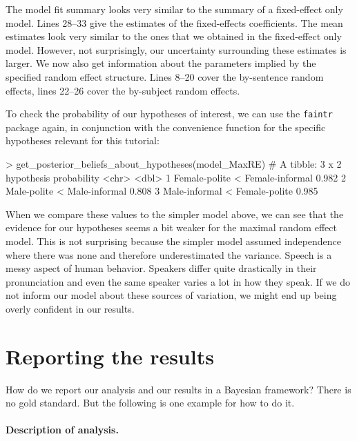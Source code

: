\documentclass[nobib]{tufte-handout}
\begin{document}
The model fit summary looks very similar to the summary of a fixed-effect only model. Lines 28--33 give the estimates of the fixed-effects coefficients. The mean estimates look very similar to the ones that we obtained in the fixed-effect only model. However, not surprisingly, our uncertainty surrounding these estimates is larger.  
We now also get information about the parameters implied by the specified random effect
structure. Lines 8--20 cover the by-sentence random effects, lines 22--26 cover the by-subject
random effects.

To check the probability of our hypotheses of interest, we can use the \texttt{faintr} package again, in conjunction with the convenience function for the specific hypotheses relevant for this tutorial:

\medskip

\begin{minipage}[]{\textwidth}
\begin{rc}
> get_posterior_beliefs_about_hypotheses(model_MaxRE)
# A tibble: 3 x 2
  hypothesis                      probability
  <chr>                                 <dbl>
1 Female-polite < Female-informal       0.982
2 Male-polite < Male-informal           0.808
3 Male-informal < Female-polite         0.985
\end{rc}
\end{minipage}

When we compare these values to the simpler model above, we can see that the evidence for our
hypotheses seems a bit weaker for the maximal random effect model. This is not surprising
because the simpler model assumed independence where there was none and therefore
underestimated the variance. Speech is a messy aspect of human behavior. Speakers differ quite
drastically in their pronunciation and even the same speaker varies a lot in how they speak.
If we do not inform our model about these sources of variation, we might end up being overly confident in our results.


\section{Reporting the results}
How do we report our analysis and our results in a Bayesian framework? There is no gold
standard. But the following is one example for how to do it.

\paragraph{Description of analysis.}
\end{document}
